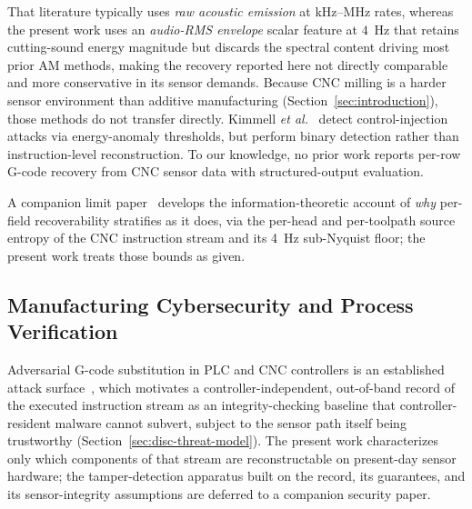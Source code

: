 \documentclass[sensors,article,submit,moreauthors,pdftex]{Definitions/mdpi}
\newcommand{\etal}{\textit{et al.}}
\begin{document}
That literature typically uses \emph{raw acoustic emission} at kHz--MHz rates, whereas the present work uses an \emph{audio-RMS envelope} scalar feature at $4$~Hz that retains cutting-sound energy magnitude but discards the spectral content driving most prior AM methods, making the recovery reported here not directly comparable and more conservative in its sensor demands. Because CNC milling is a harder sensor environment than additive manufacturing (Section~\ref{sec:introduction}), those methods do not transfer directly. Kimmell \etal~\cite{kimmell2025cnc} detect control-injection attacks via energy-anomaly thresholds, but perform binary detection rather than instruction-level reconstruction. To our knowledge, no prior work reports per-row G-code recovery from CNC sensor data with structured-output evaluation.

A companion limit paper~\cite{paperB_entropy} develops the information-theoretic account of \emph{why} per-field recoverability stratifies as it does, via the per-head and per-toolpath source entropy of the CNC instruction stream and its 4~Hz sub-Nyquist floor; the present work treats those bounds as given.

\subsection{Manufacturing Cybersecurity and Process Verification}
\label{sec:related-security}

Adversarial G-code substitution in PLC and CNC controllers is an established attack surface~\cite{kimmell2025cnc}, which motivates a controller-independent, out-of-band record of the executed instruction stream as an integrity-checking baseline that controller-resident malware cannot subvert, subject to the sensor path itself being trustworthy (Section~\ref{sec:disc-threat-model}). The present work characterizes only which components of that stream are reconstructable on present-day sensor hardware; the tamper-detection apparatus built on the record, its guarantees, and its sensor-integrity assumptions are deferred to a companion security paper.
\end{document}
